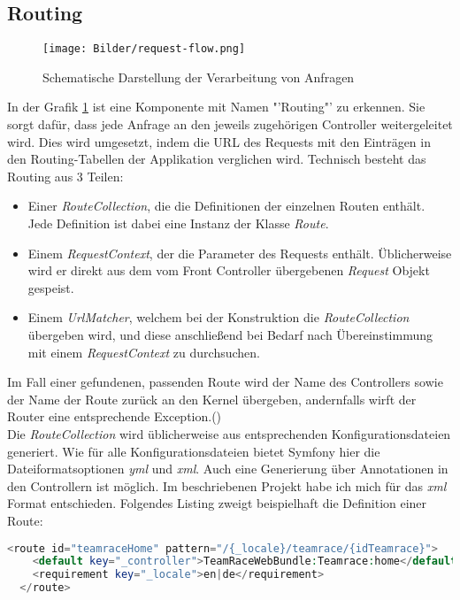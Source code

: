 \documentclass[12pt]{report}
\begin{document}
\subsection{Routing}

\begin{figure}[htp]
\centering
\texttt{[image: Bilder/request-flow.png]}
\caption{Schematische Darstellung der Verarbeitung von Anfragen \cite{sf2:HTTPFundamentals}}
\label{fig:RequestFlow}
\end{figure}
In der Grafik \ref{fig:RequestFlow} ist eine Komponente mit Namen "'Routing"' zu erkennen. Sie sorgt dafür, dass jede Anfrage an den jeweils zugehörigen Controller weitergeleitet wird. Dies wird umgesetzt, indem die URL des Requests mit den Einträgen in den Routing-Tabellen der Applikation verglichen wird. Technisch besteht das Routing aus 3 Teilen: 

\begin{itemize}
\item{Einer \emph{RouteCollection}, die die Definitionen der einzelnen Routen enthält. Jede Definition ist dabei eine Instanz der Klasse \emph{Route}}.
\item{Einem \emph{RequestContext}, der die Parameter des Requests enthält. Üblicherweise wird er direkt aus dem vom Front Controller übergebenen \emph{Request} Objekt gespeist.}
\item{Einem \emph{UrlMatcher}, welchem bei der Konstruktion die \emph{RouteCollection} übergeben wird, und diese anschließend bei Bedarf nach Übereinstimmung mit einem \emph{RequestContext} zu durchsuchen.}
\end{itemize}

Im Fall einer gefundenen, passenden Route wird der Name des Controllers sowie der Name der Route zurück an den Kernel übergeben, andernfalls wirft der Router eine entsprechende Exception.(\cite{sf2:RoutingComponent})\\

Die \emph{RouteCollection} wird üblicherweise aus entsprechenden Konfigurationsdateien generiert. Wie für alle Konfigurationsdateien bietet Symfony hier die Dateiformatsoptionen \emph{yml} und \emph{xml}. Auch eine Generierung über Annotationen in den Controllern ist möglich. Im beschriebenen Projekt habe ich mich für das \emph{xml} Format entschieden. Folgendes Listing zweigt beispielhaft die Definition einer Route:

\begin{lstlisting}[language=PHP, caption=Auszug aus\\ src/TeamRace/WebBundle/Resources/config/routing.xml]
  <route id="teamraceHome" pattern="/{_locale}/teamrace/{idTeamrace}">
    <default key="_controller">TeamRaceWebBundle:Teamrace:home</default>
    <requirement key="_locale">en|de</requirement>
  </route>
  
\end{lstlisting}
  
\end{document}
